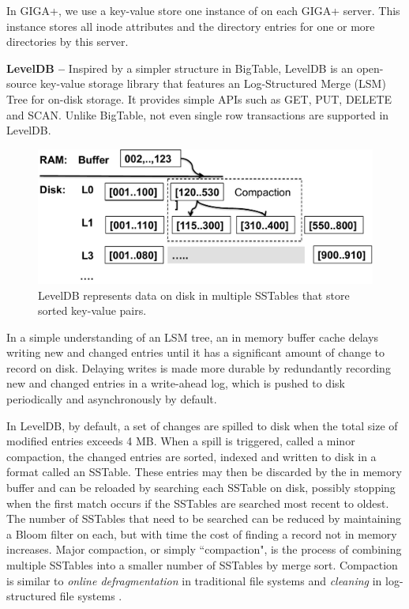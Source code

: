 
In GIGA+, we use a key-value store 
one instance of \ldb \citep{LevelDB} on each GIGA+ server.
This \ldb instance stores all inode attributes and the directory entries 
for one or more directories by this server.

\textbf{LevelDB -- }
Inspired by a simpler structure in BigTable\citep{BigTable}, LevelDB \citep{LevelDB} is an open-source key-value storage library
that features an Log-Structured Merge (LSM) Tree \citep{ONeil1996} for on-disk storage.
It provides simple APIs such as GET, PUT, DELETE and SCAN.
Unlike BigTable, not even single row transactions are supported in LevelDB. 

\begin{figure}[!ht]
\centering
\includegraphics[scale=0.4]{figs/leveldb}
\caption{LevelDB represents data on disk in multiple SSTables that store sorted key-value pairs.}
\label{fig:leveldb}
\end{figure}

In a simple understanding of an LSM tree, an in memory buffer cache delays writing new and changed entries until it has a significant amount of change to record on disk. Delaying writes is made more durable by redundantly recording new and changed entries in a write-ahead log, which is pushed to disk periodically and asynchronously by default.

In LevelDB, by default, a set of changes are spilled to disk when the total size of modified entries exceeds 4 MB.  When a spill is triggered, called a minor compaction, the changed entries are sorted, indexed and written to disk in a format called an SSTable\citep{BigTable}.  These entries may then be discarded by the in memory buffer and can be reloaded by searching each SSTable on disk, possibly stopping when the first match occurs if the SSTables are searched most recent to oldest.  The number of SSTables that need to be searched can be reduced by maintaining a Bloom filter\citep{bloomfilter} on each, but with time the cost of finding a record not in memory increases.  Major compaction, or simply ``compaction", is the process of combining multiple SSTables into a smaller number of SSTables by merge sort. Compaction is similar to \emph{online defragmentation} in traditional file systems and \emph{cleaning} in log-structured file systems \citep{LFS}.

